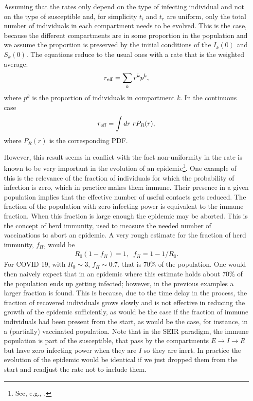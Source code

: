 \documentclass[a4paper,oneside,11pt]{article}
\begin{document}
Assuming that the rates only depend on the type of infecting individual and not on the type of susceptible and, for simplicity $t_i$ and $t_r$ are uniform, only the total number of individuals in each compartment needs to be evolved. This is the case, because the different compartments are in some proportion in the population and we assume the proportion is preserved by
 the initial conditions of the $I_k(0)$ and $S_k(0)$. The equations reduce to the usual ones with a rate that is the weighted average:
 \begin{eqnarray}
 r_{\rm eff} = \sum_k r^k p^k,
 \end{eqnarray}
 where $p^k$ is the proportion of individuals in compartment $k$. In the continuous case
 \begin{eqnarray}
 r_{\rm eff} = \int dr ~r P_R(r),
 \end{eqnarray}
 where $P_R(r)$ is the corresponding PDF. 

 However, this result seems in conflict with the fact non-uniformity in the rate is known to be very important in the evolution of an epidemic\footnote{See, e.g., \cite{Keeling2005,Bansal2007}.}. One example of this is the relevance of the fraction of individuals for which the probability of infection is zero, which in practice makes them immune. Their presence in a given population implies that the effective number of useful contacts gets reduced. The fraction of the population with zero infecting power is equivalent to the immune fraction. When this fraction is large enough  the epidemic may be aborted. This is the concept of herd immunity, used to measure the needed number of vaccinations to abort an epidemic. A very rough estimate for the fraction of herd immunity, $f_H$, would be
   \begin{eqnarray}
  R_0 (1- f_H)  =1, \;\; f_H= 1-1/R_0.
   \end{eqnarray}
   For COVID-19, with $R_0 \sim 3$, $f_H \sim 0.7$, that is $70\%$ of the population. {One would then naively expect that in an epidemic where this estimate holds about $70\%$ of the population ends up getting infected; however, in the previous examples a larger fraction is found.} This is because{, due to} the time delay in the process, the fraction of recovered individuals grows slowly and is not effective in reducing the growth of the epidemic sufficiently, as would be the case if the fraction of immune individuals {had been present} from the start, as would be the case, for instance, in a (partially) vaccinated population. Note that in the SEIR paradigm, the immune population is part of the susceptible, that pass by the compartments $E\rightarrow I \rightarrow R$ but have zero infecting power when they are $I$ so they are inert. In practice the evolution of the epidemic would be identical if we just dropped them from the start and readjust the rate not to include them. 
 
\end{document}
